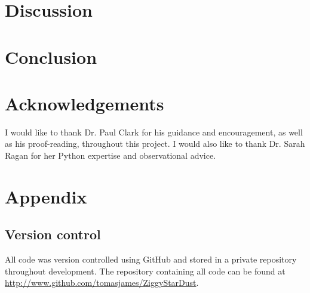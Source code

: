 \documentclass{report}
\begin{document}

\chapter{Discussion}


\chapter{Conclusion}


\chapter*{Acknowledgements}
I would like to thank Dr. Paul Clark for his guidance and encouragement, as well as his proof-reading, throughout this project. I would also like to thank Dr. Sarah Ragan for her Python expertise and observational advice.


\chapter*{Appendix}

\section*{Version control}
All code was version controlled using GitHub and stored in a private repository throughout development. The repository containing all code can be found at \href{http://www.github.com/tomasjames/ZiggyStarDust}{http://www.github.com/tomasjames/ZiggyStarDust}.


\printbibliography


\end{document}

